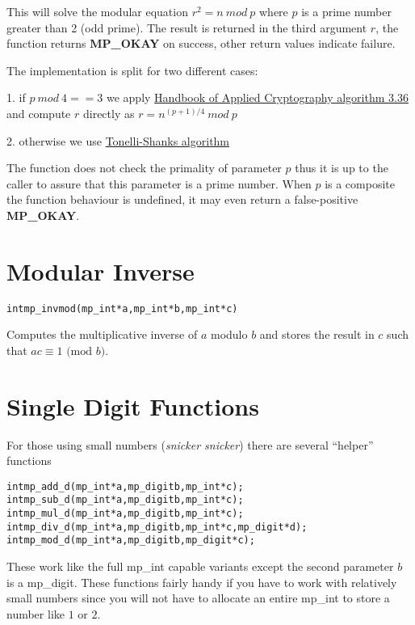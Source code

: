 \documentclass[synpaper]{book}
\def\mod{{\mathit\ mod\ }}
\begin{document}
This will solve the modular equation $r^2 = n \mod p$ where $p$ is a prime number greater than 2 (odd prime).
The result is returned in the third argument $r$, the function returns \textbf{MP\_OKAY} on success,
other return values indicate failure.

The implementation is split for two different cases:

1. if $p \mod 4 == 3$ we apply \href{http://cacr.uwaterloo.ca/hac/}{Handbook of Applied Cryptography algorithm 3.36} and compute $r$ directly as
$r = n^{(p+1)/4} \mod p$

2. otherwise we use \href{https://en.wikipedia.org/wiki/Tonelli-Shanks_algorithm}{Tonelli-Shanks algorithm}

The function does not check the primality of parameter $p$ thus it is up to the caller to assure that this parameter
is a prime number. When $p$ is a composite the function behaviour is undefined, it may even return a false-positive
\textbf{MP\_OKAY}.

\section{Modular Inverse}
\begin{alltt}
int mp_invmod (mp_int * a, mp_int * b, mp_int * c)
\end{alltt}
Computes the multiplicative inverse of $a$ modulo $b$ and stores the result in $c$ such that $ac \equiv 1 \mbox{ (mod }b\mbox{)}$.

\section{Single Digit Functions}

For those using small numbers (\textit{snicker snicker}) there are several ``helper'' functions

    
\begin{alltt}
int mp_add_d(mp_int *a, mp_digit b, mp_int *c);
int mp_sub_d(mp_int *a, mp_digit b, mp_int *c);
int mp_mul_d(mp_int *a, mp_digit b, mp_int *c);
int mp_div_d(mp_int *a, mp_digit b, mp_int *c, mp_digit *d);
int mp_mod_d(mp_int *a, mp_digit b, mp_digit *c);
\end{alltt}

These work like the full mp\_int capable variants except the second parameter $b$ is a mp\_digit.  These
functions fairly handy if you have to work with relatively small numbers since you will not have to allocate
an entire mp\_int to store a number like $1$ or $2$.
\end{document}
